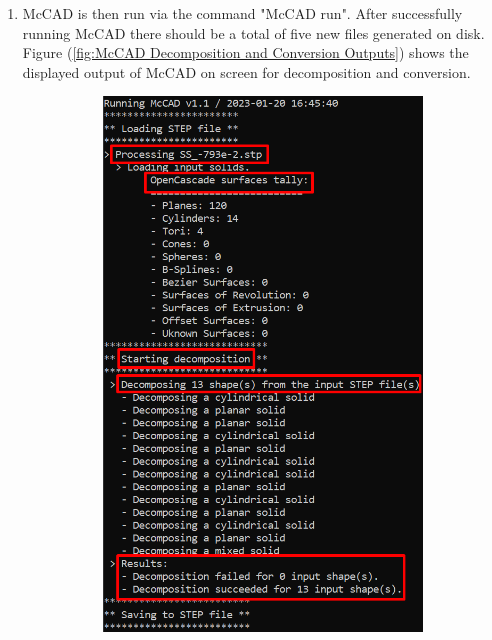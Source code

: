 \documentclass[12pt, a4paper, titlepage]{article}
\begin{document}
\begin{enumerate}
  \item McCAD is then run via the command "McCAD run". After successfully running McCAD there should be a total of five new files generated on disk. Figure (\ref{fig:McCAD Decomposition and Conversion Outputs}) shows the displayed output of McCAD on screen for decomposition and conversion.
  \begin{figure}[h!]
  	\centering
  	\begin{subfigure}{.5\textwidth}
  		\centering
  		\includegraphics[width=.8\linewidth]{figures/McCAD_output_decomposition.png}
  		\caption{}
  		\label{fig:a}
  	\end{subfigure}%
  	\begin{subfigure}{.5\textwidth}
  		\centering

\end{subfigure}
\end{figure}
\end{enumerate}
\end{document}
